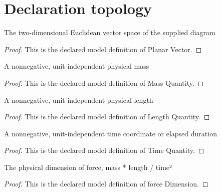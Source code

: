 \section{Declaration topology}
\begin{definition}
  \label{def:physics:phyx-mini-0703:phyxminiproblems-problemphyxmini0703-planarvector}
  The two-dimensional Euclidean vector space of the supplied diagram
\end{definition}
\begin{proof}
  This is the declared model definition of Planar Vector.
\end{proof}
\begin{definition}
  \label{def:physics:phyx-mini-0703:phyxminiproblems-problemphyxmini0703-massquantity}
  A nonnegative, unit-independent physical mass
\end{definition}
\begin{proof}
  This is the declared model definition of Mass Quantity.
\end{proof}
\begin{definition}
  \label{def:physics:phyx-mini-0703:phyxminiproblems-problemphyxmini0703-lengthquantity}
  A nonnegative, unit-independent physical length
\end{definition}
\begin{proof}
  This is the declared model definition of Length Quantity.
\end{proof}
\begin{definition}
  \label{def:physics:phyx-mini-0703:phyxminiproblems-problemphyxmini0703-timequantity}
  A nonnegative, unit-independent time coordinate or elapsed duration
\end{definition}
\begin{proof}
  This is the declared model definition of Time Quantity.
\end{proof}
\begin{definition}
  \label{def:physics:phyx-mini-0703:phyxminiproblems-problemphyxmini0703-forcedimension}
  The physical dimension of force, mass * length / time²
\end{definition}
\begin{proof}
  This is the declared model definition of force Dimension.
\end{proof}
